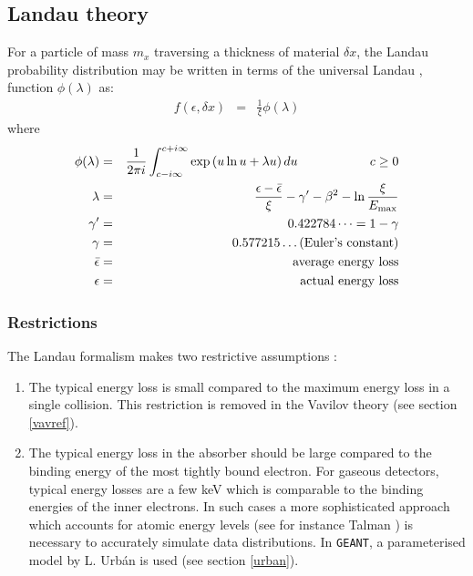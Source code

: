 \subsection{ Landau theory}
\label{sec:phys332-1}
For a particle of mass $m_x$ traversing a thickness of material
$\delta x $,
the Landau probability distribution  may be written in terms of the
universal Landau \cite{bib-LAND}, \cite{bib-KOL3} function $\phi(\lambda)$ as:
\begin{eqnarray*}
f( \epsilon , \delta x ) & = &\frac{1}{\xi} \phi ( \lambda )    
\end{eqnarray*}
where
\begin{eqnarray*}
\phi(\lambda )& = & \frac{1} {2 \pi i}\int^{c+i\infty}_{c-i\infty}
\exp \left ( u \ln u + \lambda u \right ) du \hspace{2cm} c \geq 0 \\
\lambda       & = & \frac{\epsilon  -\bar{\epsilon} }{\xi}
  - \gamma' - \beta^2 - \ln \frac{\xi} {E_{\rm max}}          \\
\gamma' & = & 0.422784\dots = 1 - \gamma \\
\gamma             & = & 0.577215\dots \mbox{(Euler's constant)}   \\
\bar{\epsilon}  & = & \mbox{average energy loss}                    \\
\epsilon      & = & \mbox{actual energy loss}
\end{eqnarray*}

\subsubsection{Restrictions}
The Landau formalism makes two restrictive assumptions :
\begin{enumerate}
\item The typical energy loss is small compared to the maximum energy
loss in a single collision.
This restriction is removed in the Vavilov theory (see section 
\ref{vavref}).
\item
The typical energy loss in the absorber should be large compared
to the binding energy of the most tightly bound electron.
For gaseous detectors, typical energy losses are a few
keV which is comparable to the binding energies of the inner electrons.
In such cases a more sophisticated approach which accounts for atomic
energy levels (see for instance Talman \cite{bib-TALM}) is necessary
to accurately simulate data distributions. In {\tt GEANT}, a parameterised
model by L. Urb\'{a}n is used (see section \ref{urban}).
\end{enumerate}

